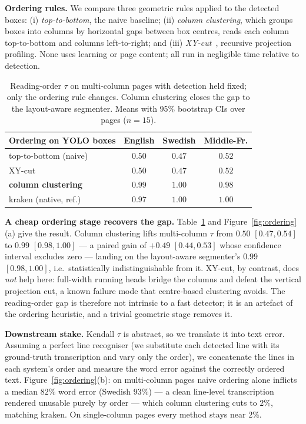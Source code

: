 \documentclass[11pt]{article}
\newcommand{\tw}{\ensuremath{\tau}}
\begin{document}
\textbf{Ordering rules.} We compare three geometric rules applied to the detected
boxes: (i) \emph{top-to-bottom}, the naive baseline; (ii) \emph{column
clustering}, which groups boxes into columns by horizontal gaps between box
centres, reads each column top-to-bottom and columns left-to-right; and (iii)
\emph{XY-cut}~\cite{xycut}, recursive projection profiling. None uses learning or
page content; all run in negligible time relative to detection.

\begin{table}[t]
\centering
\caption{Reading-order \tw{} on multi-column pages with detection held fixed;
only the ordering rule changes. Column clustering closes the gap to the
layout-aware segmenter. Means with 95\% bootstrap CIs over pages ($n=15$).}
\label{tab:ordering}
\begin{tabular}{lccc}
\toprule
Ordering on YOLO boxes & English & Swedish & Middle-Fr. \\
\midrule
top-to-bottom (naive)     & $0.50$ & $0.47$ & $0.52$ \\
XY-cut                    & $0.50$ & $0.47$ & $0.52$ \\
\textbf{column clustering}& $\mathbf{0.99}$ & $\mathbf{1.00}$ & $\mathbf{0.98}$ \\
\midrule
kraken (native, ref.)     & $0.97$ & $1.00$ & $1.00$ \\
\bottomrule
\end{tabular}
\end{table}

\textbf{A cheap ordering stage recovers the gap.} Table~\ref{tab:ordering} and
Figure~\ref{fig:ordering}(a) give the result. Column clustering lifts multi-column
\tw{} from $0.50$ $[0.47,0.54]$ to $0.99$ $[0.98,1.00]$ --- a paired gain of
$+0.49$ $[0.44,0.53]$ whose confidence interval excludes zero --- landing on the
layout-aware segmenter's $0.99$ $[0.98,1.00]$, i.e.\ statistically
indistinguishable from it. XY-cut, by contrast, does \emph{not} help here:
full-width running heads bridge the columns and defeat the vertical projection
cut, a known failure mode that centre-based clustering avoids. The reading-order
gap is therefore not intrinsic to a fast detector; it is an artefact of the
ordering heuristic, and a trivial geometric stage removes it.

\textbf{Downstream stake.} Kendall \tw{} is abstract, so we translate it into text
error. Assuming a perfect line recogniser (we substitute each detected line with
its ground-truth transcription and vary only the order), we concatenate the lines
in each system's order and measure the word error against the correctly ordered
text. Figure~\ref{fig:ordering}(b): on multi-column pages naive ordering alone
inflicts a median $82\%$ word error (Swedish $93\%$) --- a clean line-level
transcription rendered unusable purely by order --- which column clustering cuts
to $2\%$, matching kraken. On single-column pages every method stays near $2\%$.
\end{document}
